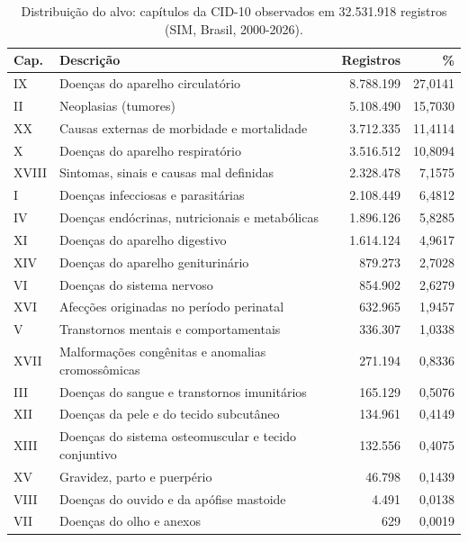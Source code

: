 \documentclass[12pt]{article}
\begin{document}
\begin{table}[ht]
\centering
\caption{Distribuição do alvo: capítulos da CID-10 observados em 32.531.918 registros (SIM, Brasil, 2000-2026).}
\label{tab:classes}
\small
\begin{tabular}{|l|l|r|r|}
\hline
\textbf{Cap.} & \textbf{Descrição} & \textbf{Registros} & \textbf{\%} \\
\hline
IX    & Doenças do aparelho circulatório                       & 8.788.199 & 27,0141 \\
II    & Neoplasias (tumores)                                   & 5.108.490 & 15,7030 \\
XX    & Causas externas de morbidade e mortalidade             & 3.712.335 & 11,4114 \\
X     & Doenças do aparelho respiratório                       & 3.516.512 & 10,8094 \\
XVIII & Sintomas, sinais e causas mal definidas                & 2.328.478 &  7,1575 \\
I     & Doenças infecciosas e parasitárias                     & 2.108.449 &  6,4812 \\
IV    & Doenças endócrinas, nutricionais e metabólicas         & 1.896.126 &  5,8285 \\
XI    & Doenças do aparelho digestivo                          & 1.614.124 &  4,9617 \\
XIV   & Doenças do aparelho geniturinário                      &   879.273 &  2,7028 \\
VI    & Doenças do sistema nervoso                             &   854.902 &  2,6279 \\
XVI   & Afecções originadas no período perinatal               &   632.965 &  1,9457 \\
V     & Transtornos mentais e comportamentais                  &   336.307 &  1,0338 \\
XVII  & Malformações congênitas e anomalias cromossômicas      &   271.194 &  0,8336 \\
III   & Doenças do sangue e transtornos imunitários            &   165.129 &  0,5076 \\
XII   & Doenças da pele e do tecido subcutâneo                 &   134.961 &  0,4149 \\
XIII  & Doenças do sistema osteomuscular e tecido conjuntivo   &   132.556 &  0,4075 \\
XV    & Gravidez, parto e puerpério                            &    46.798 &  0,1439 \\
VIII  & Doenças do ouvido e da apófise mastoide                &     4.491 &  0,0138 \\
VII   & Doenças do olho e anexos                               &       629 &  0,0019 \\
\hline
\end{tabular}
\end{table}
\end{document}
